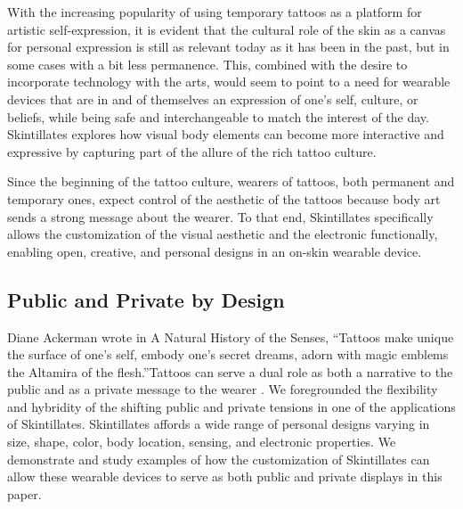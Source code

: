 \documentclass{sigchi}
\begin{document}
With the increasing popularity of using temporary tattoos as a platform for artistic self-expression\cite{Fanning:v_9LfC8A,ByCourtneyRubin:tj}, it is evident that the cultural role of the skin as a canvas for personal expression is still as relevant today as it has been in the past, but in some cases with a bit less permanence.  This, combined with the desire to incorporate technology with the arts, would seem to point to a need for wearable devices that are in and of themselves an expression of one's self, culture, or beliefs, while being safe and interchangeable to match the interest of the day. Skintillates explores how visual body elements can become more interactive and expressive by capturing part of the allure of the rich tattoo culture. 

Since the beginning of the tattoo culture, wearers of tattoos, both permanent and temporary ones, expect control of the aesthetic of the tattoos because body art sends a strong message about the wearer\cite{Doss:2009ee,McLeod:2014ua}. To that end, Skintillates specifically allows the customization of the visual aesthetic and the electronic functionally, enabling open, creative, and personal designs in an on-skin wearable device.

\subsection{Public and Private by Design}
Diane Ackerman wrote in A Natural History of the Senses, ``Tattoos make unique the surface of one's self, embody one's secret dreams, adorn with magic emblems the Altamira of the flesh.''\cite{Mifflin:2013ux}Tattoos can serve a dual role as both a narrative to the public and as a private message to the wearer \cite{Doss:2009ee,McLeod:2014ua}. We foregrounded the flexibility and hybridity of the shifting public and private tensions in one of the applications of Skintillates. Skintillates affords a wide range of personal designs varying in size, shape, color, body location, sensing, and electronic properties. We demonstrate and study examples of how the customization of Skintillates can allow these wearable devices to serve as both public and private displays in this paper. 
\end{document}
